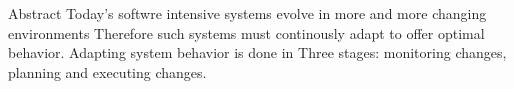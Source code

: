 Abstract
Today's softwre intensive systems evolve in more and more changing environments
 Therefore such systems must continously adapt to offer optimal behavior. 
 Adapting system behavior is done in Three stages: monitoring changes, planning and executing changes.
